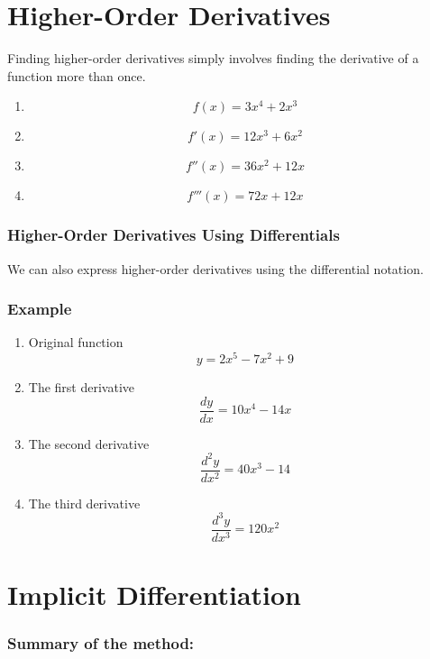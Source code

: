 \documentclass[a4paper,11pt]{book}
\begin{document}
\section{Higher-Order Derivatives}
Finding higher-order derivatives simply involves finding the derivative of a function more than once.

\begin{enumerate}
\LARGE
  \item \[ f(x) = 3x^4 + 2x^3 \]
  \item \[ f'(x) = 12x^3 + 6x^2 \]
  \item \[ f''(x) = 36x^2 + 12x \]
  \item \[ f'''(x) = 72x  + 12x \]
\end{enumerate}

\subsubsection{Higher-Order Derivatives Using Differentials}
We can also express higher-order derivatives using the differential notation.

\subsubsection{Example}

\LARGE
\begin{enumerate}
\item \normalsize Original function \LARGE \[ y = 2x^5 - 7x^2 + 9 \] 
\item \normalsize The first derivative \LARGE \[ \frac{dy}{dx} = 10x^4 - 14x \]
\item \normalsize The second derivative \LARGE \[ \frac{d^2y}{dx^2} = 40x^3 - 14 \]
\item \normalsize The third derivative \LARGE \[ \frac{d^3y}{dx^3} = 120x^2 \]
\end{enumerate}








\section{Implicit Differentiation}

\subsubsection{Summary of the method:}
\end{document}
